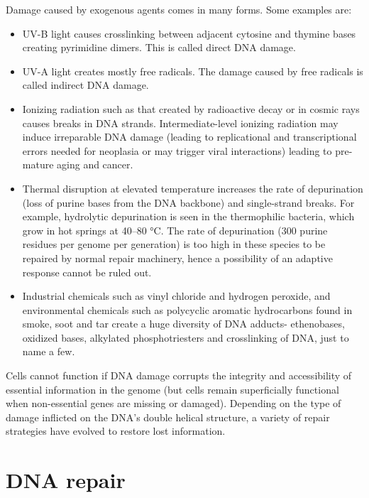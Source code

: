 Damage caused by exogenous agents comes in many forms. Some examples are:

\begin{itemize}
\tightlist
\item
  UV-B light causes crosslinking between adjacent cytosine and thymine bases creating pyrimidine dimers. This is called direct DNA damage.
\item
  UV-A light creates mostly free radicals. The damage caused by free radicals is called indirect DNA damage.
\item
  Ionizing radiation such as that created by radioactive decay or in cosmic rays causes breaks in DNA strands. Intermediate-level ionizing radiation may induce irreparable DNA damage (leading to replicational and transcriptional errors needed for neoplasia or may trigger viral interactions) leading to pre-mature aging and cancer.
\item
  Thermal disruption at elevated temperature increases the rate of depurination (loss of purine bases from the DNA backbone) and single-strand breaks. For example, hydrolytic depurination is seen in the thermophilic bacteria, which grow in hot springs at 40--80 °C. The rate of depurination (300 purine residues per genome per generation) is too high in these species to be repaired by normal repair machinery, hence a possibility of an adaptive response cannot be ruled out.
\item
  Industrial chemicals such as vinyl chloride and hydrogen peroxide, and environmental chemicals such as polycyclic aromatic hydrocarbons found in smoke, soot and tar create a huge diversity of DNA adducts- ethenobases, oxidized bases, alkylated phosphotriesters and crosslinking of DNA, just to name a few.
\end{itemize}

Cells cannot function if DNA damage corrupts the integrity and accessibility of essential information in the genome (but cells remain superficially functional when non-essential genes are missing or damaged). Depending on the type of damage inflicted on the DNA's double helical structure, a variety of repair strategies have evolved to restore lost information.

\hypertarget{dna-repair}{%
\section{DNA repair}\label{dna-repair}}

